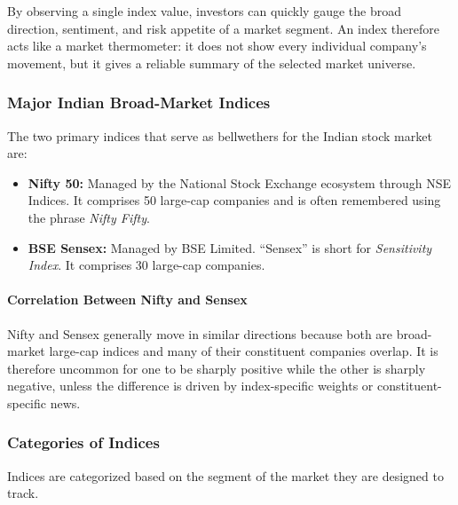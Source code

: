 \documentclass[12pt,openany]{book}
\begin{document}
By observing a single index value, investors can quickly gauge the broad direction, sentiment, and risk appetite of a market segment. An index therefore acts like a market thermometer: it does not show every individual company's movement, but it gives a reliable summary of the selected market universe.

\subsubsection{Major Indian Broad-Market Indices}
The two primary indices that serve as bellwethers for the Indian stock market are:

\begin{itemize}[leftmargin=*]
    \item \textbf{Nifty 50:} Managed by the National Stock Exchange ecosystem through NSE Indices. It comprises 50 large-cap companies and is often remembered using the phrase \emph{Nifty Fifty}.
    \item \textbf{BSE Sensex:} Managed by BSE Limited. ``Sensex'' is short for \emph{Sensitivity Index}. It comprises 30 large-cap companies.
\end{itemize}

\paragraph{Correlation Between Nifty and Sensex}
Nifty and Sensex generally move in similar directions because both are broad-market large-cap indices and many of their constituent companies overlap. It is therefore uncommon for one to be sharply positive while the other is sharply negative, unless the difference is driven by index-specific weights or constituent-specific news.

\subsubsection{Categories of Indices}
Indices are categorized based on the segment of the market they are designed to track.
\end{document}
